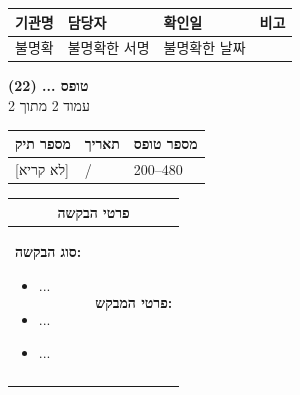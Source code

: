 \documentclass[UTF8,10pt,a4paper,fontset=fandol]{ctexart}
\newcommand{\fieldvalue}[1]{#1}
\newcommand{\handwritten}[1]{#1}
\begin{document}
\noindent
\begin{tabularx}{\textwidth}{|l|X|X|X|}
\hline
기관명 & 담당자 & 확인일 & 비고 \\
\hline
불명확 &
\fieldvalue{\handwritten{불명확한 서명}} &
\fieldvalue{\handwritten{불명확한 날짜}} &
\\
\hline
\end{tabularx}


\newpage

\begin{flushright}
\textbf{טופס ... (22)}\\
עמוד 2 מתוך 2
\end{flushright}

\begin{tabularx}{\textwidth}{|X|X|X|}
\hline
\textbf{מספר תיק} & \textbf{תאריך} & \textbf{מספר טופס}\\
\hline
\fieldvalue{\handwritten{[לא קריא]}}
&
\fieldvalue{\handwritten{/}}
&
200--480
\\
\hline
\end{tabularx}

\vspace{0.5em}

\begin{tabularx}{\textwidth}{|p{}|X|}
\hline
\multicolumn{2}{|c|}{\textbf{פרטי הבקשה}}\\
\hline
\textbf{סוג הבקשה:}
\begin{itemize}
  \item[$\square$] ...
  \item[$\square$] ...
  \item[$\square$] ...
\end{itemize}
&
\textbf{פרטי המבקש:}\\[1em]
\\
\hline
\end{tabularx}

\vspace{0.5em}
\end{document}
